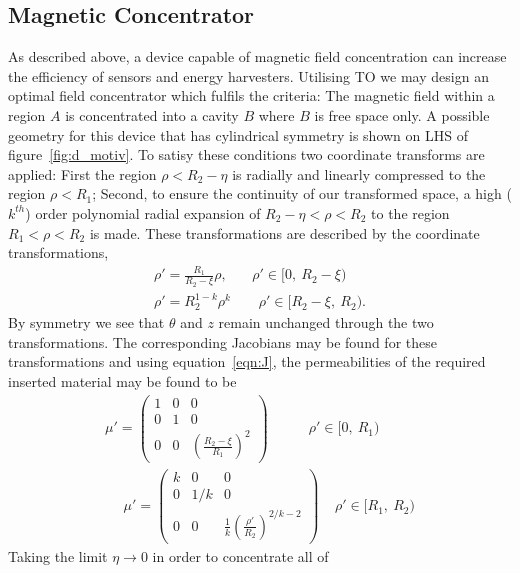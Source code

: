 \documentclass[11pt]{iopart}
\begin{document}
\subsection{Magnetic Concentrator}
As described above, a device capable of magnetic field concentration
can increase the efficiency of sensors and energy harvesters.
Utilising TO we may design an optimal field concentrator which fulfils
the criteria: The magnetic field within a region $A$ is concentrated
into a cavity $B$ where $B$ is free space only. A possible geometry
for this device that has cylindrical symmetry is shown on LHS of
figure~\ref{fig:d_motiv}.  To satisy these conditions two coordinate
transforms are applied: First the region $\rho < R_2 - \eta$ is
radially and linearly compressed to the region $\rho < R_1$; Second,
to ensure the continuity of our transformed space, a high ($k^{th}$)
order polynomial radial expansion of $R_2 - \eta < \rho < R_2$ to the
region $R_1 < \rho < R_2$ is made. These transformations are described
by the coordinate transformations,
\begin{equation}
  \label{eqn:transform}
  \begin{split}
\rho' = \frac{R_1}{R_2-\xi}\rho,~~~~~~~~\rho'\in[0,~R_2-\xi)~~\\
\rho' = R_2^{1-k}\rho^k~~~~~~~~~\rho'\in[R_2-\xi,~R_2).
  \end{split}
\end{equation}
By symmetry we see that $\theta$ and $z$ remain unchanged through the
two transformations. The corresponding Jacobians may be found for
these transformations and using equation~\ref{eqn:J}, the
permeabilities of the required inserted material may be found to be
\begin{equation}
  \label{eqn:mat}
  \begin{split}
 \mu' = \begin{pmatrix}1&0&0\\0&1&0\\0&0&(\frac{R_2-\xi}{R_1})^2\end{pmatrix}~~~~~~~~~~~~~\rho'\in[0,~R_1)~~\\
~~~~~~\mu' = \begin{pmatrix}k&0&0\\0&1/k&0\\0&0&\frac{1}{k}(\frac{\rho'}{R_2})^{2/k-2}\end{pmatrix}~~~~~\rho'\in[R_1,~R_2)
  \end{split}
\end{equation}
Taking the limit $\eta \rightarrow 0$ in order to concentrate all of
\end{document}
